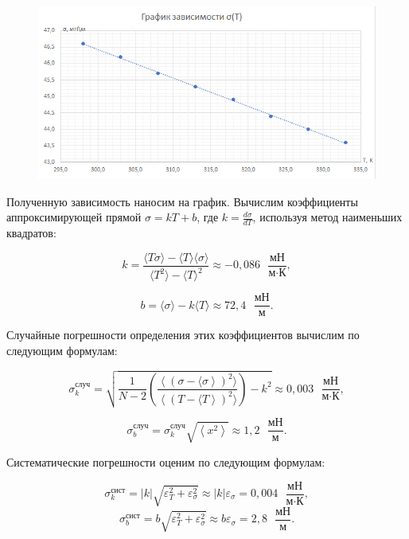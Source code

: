 \documentclass[12pt,a4paper]{article}
\begin{document}
\begin{figure}[H]
	\begin{center}
		\includegraphics[width=14cm]{2.5.1_gr_1}
	\end{center}
\end{figure}


Полученную зависимость наносим на график. Вычислим коэффициенты аппроксимирующей прямой $ \sigma = kT + b $, где $ \displaystyle k = \frac{d\sigma}{dT} $, используя метод наименьших квадратов:

\[ k = \frac{\langle T\sigma \rangle - \langle T \rangle \langle \sigma \rangle}{\langle T^2 \rangle - \langle T \rangle ^2} \approx -0,086\text{ } \frac{\text{мН}}{\text{м}\cdot\text{К}},\]

\[ b = \langle \sigma \rangle - k\langle T \rangle \approx 72,4\text{ } \frac{\text{мН}}{\text{м}}. \]

Случайные погрешности определения этих коэффициентов вычислим по следующим формулам:

\[ \sigma^\text{случ}_k = \sqrt{\frac{1}{N-2} \left(\frac{\left\langle\left(\sigma - \langle \sigma\right\rangle\right)^2 \rangle}{\left\langle\left(T - \langle T\right\rangle\right)^2 \rangle}\right)-k^2} \approx 0,003 \text{ } \frac{\text{мН}}{\text{м}\cdot\text{К}},\]

\[ \sigma^\text{случ}_b=\sigma^\text{случ}_k\sqrt{\left\langle x^2 \right\rangle} \approx 1,2\text{ } \frac{\text{мН}}{\text{м}}. \]

Систематические погрешности оценим по следующим формулам:

\[ \sigma^\text{сист}_k = |k|\sqrt{\varepsilon^2_T+\varepsilon^2_\sigma} \approx |k|\varepsilon_{\sigma} = 0,004 \text{ } \frac{\text{мН}}{\text{м}\cdot\text{К}}, \]
\[ \sigma^\text{сист}_b = b\sqrt{\varepsilon^2_T+\varepsilon^2_\sigma} \approx b\varepsilon_{\sigma} = 2,8 \text{ } \frac{\text{мН}}{\text{м}}. \]
\end{document}

